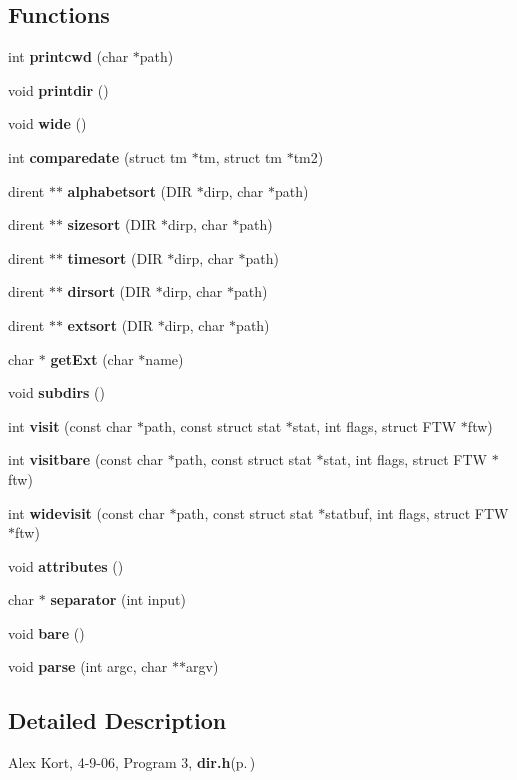 \subsection*{Functions}
\begin{CompactItemize}
\item 
int {\bf printcwd} (char $\ast$path)
\item 
void {\bf printdir} ()
\item 
void {\bf wide} ()
\item 
int {\bf comparedate} (struct tm $\ast$tm, struct tm $\ast$tm2)
\item 
dirent $\ast$$\ast$ {\bf alphabetsort} (DIR $\ast$dirp, char $\ast$path)
\item 
dirent $\ast$$\ast$ {\bf sizesort} (DIR $\ast$dirp, char $\ast$path)
\item 
dirent $\ast$$\ast$ {\bf timesort} (DIR $\ast$dirp, char $\ast$path)
\item 
dirent $\ast$$\ast$ {\bf dirsort} (DIR $\ast$dirp, char $\ast$path)
\item 
dirent $\ast$$\ast$ {\bf extsort} (DIR $\ast$dirp, char $\ast$path)
\item 
char $\ast$ {\bf get\-Ext} (char $\ast$name)
\item 
void {\bf subdirs} ()
\item 
int {\bf visit} (const char $\ast$path, const struct stat $\ast$stat, int flags, struct FTW $\ast$ftw)
\item 
int {\bf visitbare} (const char $\ast$path, const struct stat $\ast$stat, int flags, struct FTW $\ast$ftw)
\item 
int {\bf widevisit} (const char $\ast$path, const struct stat $\ast$statbuf, int flags, struct FTW $\ast$ftw)
\item 
void {\bf attributes} ()\label{dir_8h_d5d0ee102c2470b8f384863496e93b73}

\item 
char $\ast$ {\bf separator} (int input)
\item 
void {\bf bare} ()
\item 
void {\bf parse} (int argc, char $\ast$$\ast$argv)
\end{CompactItemize}


\subsection{Detailed Description}
Alex Kort, 4-9-06, Program 3, {\bf dir.h}{\rm (p.\,\pageref{dir_8h})} 

